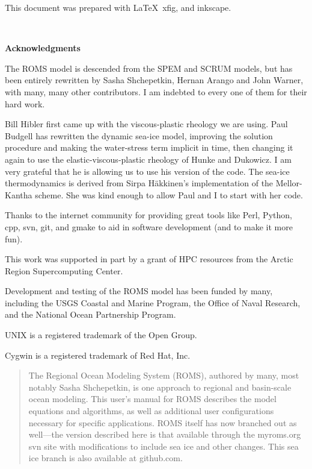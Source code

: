 \setcounter{page}{0}
This document was prepared with \LaTeX\, xfig, and inkscape.

\mbox{  }
\begin{center}
\bf \LARGE Acknowledgments
\end{center}

The ROMS model is descended from the SPEM and SCRUM models, but has
been entirely rewritten by Sasha Shchepetkin, Hernan Arango and John
Warner, with many, many other contributors. I am indebted to every one
of them for their hard work.

Bill Hibler first came up with the viscous-plastic rheology we are
using. Paul Budgell has rewritten the dynamic sea-ice model, improving
the solution procedure and making the water-stress term implicit in time,
then changing it again to use the elastic-viscous-plastic rheology of
Hunke and Dukowicz. I am very grateful that he is allowing us to use
his version of the code. The sea-ice thermodynamics is derived from
Sirpa H\"akkinen's implementation of the Mellor-Kantha scheme. She was
kind enough to allow Paul and I to start with her code.

Thanks to the internet community for providing great tools like Perl,
Python, cpp, svn, git, and gmake to aid in software development (and to make
it more fun).

This work was supported in part by a grant of HPC resources from the
Arctic Region Supercomputing Center.

Development and testing of the ROMS model has been funded by many,
including the USGS Coastal and Marine Program, the Office of Naval
Research, and the National Ocean Partnership Program.

\vspace{\fill}
UNIX is a registered trademark of the Open Group.

Cygwin is a registered trademark of Red Hat, Inc.


\vfil\break
\begin{abstract}
The Regional Ocean Modeling System (ROMS), authored by many, most
notably Sasha Shchepetkin, is one approach to regional and basin-scale ocean
modeling. This user's manual for ROMS describes the model equations
and algorithms, as well as additional user configurations necessary
for specific applications. ROMS itself has now branched out as
well---the version described here is that available through the
myroms.org svn site with modifications to include sea ice and other
changes. This sea ice branch is also available at github.com.

\end{abstract}
